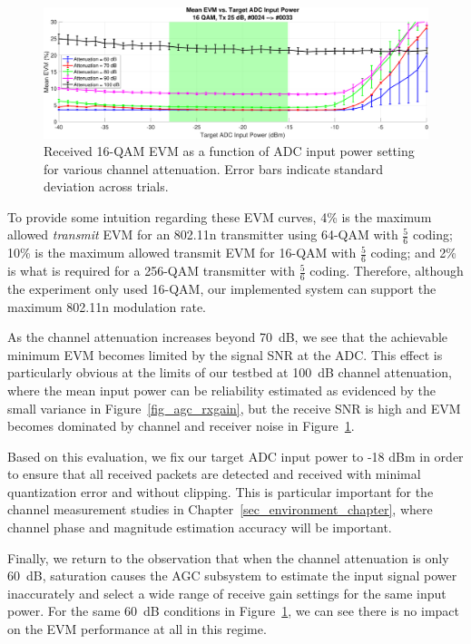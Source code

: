 \begin{figure}[hb]
\centering
  \includegraphics[width=1\linewidth]{figs/agc/AGCTarget_v_EVM_16QAM_ALLdBAtten_Tx25_20MHz_evm}   
    \caption{Received 16-QAM \ac{EVM} as a function of \ac{ADC} input power setting for various channel attenuation. Error bars indicate standard deviation across trials.}
\label{fig_agc_evm}
\end{figure}
	
	To provide some intuition regarding these \ac{EVM} curves, 4\% is the maximum allowed \emph{transmit} \ac{EVM} for an 802.11n transmitter using 64-QAM with $\frac{5}{6}$ coding; 10\% is the maximum allowed transmit \ac{EVM} for 16-QAM with $\frac{5}{6}$ coding; and 2\% is what is required for a 256-QAM transmitter with $\frac{5}{6}$ coding.
	Therefore, although the experiment only used 16-QAM, our implemented system can support the maximum 802.11n modulation rate.
	
	As the channel attenuation increases beyond 70~dB, we see that the achievable minimum \ac{EVM} becomes limited by the signal \ac{SNR} at the \ac{ADC}.
	This effect is particularly obvious at the limits of our testbed at 100~dB channel attenuation, where the mean input power can be reliability estimated as evidenced by the small variance in Figure~\ref{fig_agc_rxgain}, but the receive \ac{SNR} is high and \ac{EVM} becomes dominated by channel and receiver noise in Figure~\ref{fig_agc_evm}.
	
	Based on this evaluation, we fix our target ADC input power to -18 dBm in order to ensure that all received packets are detected and received with minimal quantization error and without clipping.
	This is particular important for the channel measurement studies in Chapter~\ref{sec_environment_chapter}, where channel phase and magnitude estimation accuracy will be important.
	
	Finally, we return to the observation that when the channel attenuation is only 60~dB, saturation causes the \ac{AGC} subsystem to estimate the input signal power inaccurately and select a wide range of receive gain settings for the same input power.
	For the same 60~dB conditions in Figure~\ref{fig_agc_evm}, we can see there is no impact on the \ac{EVM} performance at all in this regime.
	



